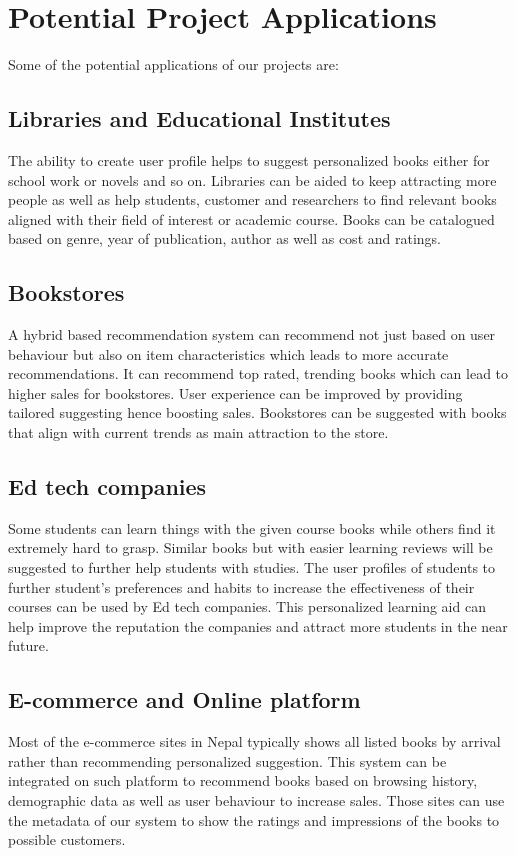 \newpage

\section{Potential Project Applications}

Some of the potential applications of our projects are:

\subsection{Libraries and Educational Institutes}
The ability to create user profile helps to suggest personalized books either for school work or novels and so on. Libraries can be aided to keep attracting more people as well as help students, customer and researchers to find relevant books aligned with their field of interest or academic course. Books can be catalogued based on genre, year of publication, author as well as cost and ratings.

\subsection{Bookstores}
A hybrid based recommendation system can recommend not just based on user behaviour but also on item characteristics which leads to more accurate recommendations. It can recommend top rated, trending books which can lead to higher sales for bookstores. User experience can be improved by providing tailored suggesting hence boosting sales. Bookstores can be suggested with books that align with current trends as main attraction to the store. 

\subsection{Ed tech companies}
Some students can learn things with the given course books while others find it extremely hard to grasp. Similar books but with easier learning reviews will be suggested to further help students with studies. The user profiles of students to further student's preferences and habits to increase the effectiveness of their courses can be used by Ed tech companies. This personalized learning aid can help improve the reputation the companies and attract more students in the near future.

\subsection{E-commerce and Online platform}
Most of the e-commerce sites in Nepal typically shows all listed books by arrival rather than recommending personalized suggestion. This system can be integrated on such platform to recommend books based on browsing history, demographic data as well as user behaviour to increase sales. Those sites can use the metadata of our system to show the ratings and impressions of the books to possible customers.

